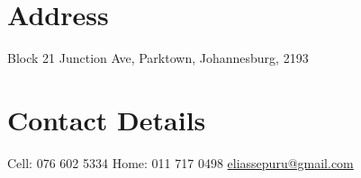 \documentclass[]{friggeri-cv}
\begin{document}
      {}
      

\begin{aside}


 \vspace{2.2cm}
  \section{Address}
  
   Block 21 Junction Ave,
   Parktown,
   Johannesburg,
   2193
    ~
  \section{Contact Details}
    Cell: 076 602 5334
    Home: 011 717 0498
    \href{mailto:eliassepuru@gmail.com}{{eliassepuru@gmail.com}}
    ~

\end{aside}
\end{document}
